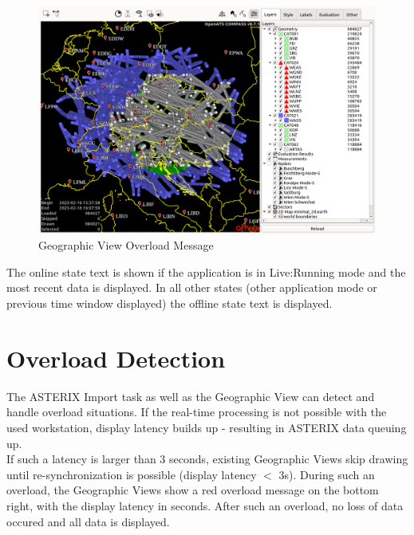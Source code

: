 \begin{figure}[H]
    \hspace*{-2.5cm}
    \includegraphics[width=19cm,frame]{figures/geoview_offline_status.png}
  \caption{Geographic View Overload Message}
\end{figure} 

The online state text is shown if the application is in Live:Running mode and the most recent data is displayed. In all other states (other application mode or previous time window displayed) the offline state text is displayed.


\section{Overload Detection}

The ASTERIX Import task as well as the Geographic View can detect and handle overload situations. If the real-time processing is not possible with the used workstation, display latency builds up - resulting in ASTERIX data queuing up. \\

If such a latency is larger than 3 seconds,  existing Geographic Views skip drawing until re-synchronization is possible (display latency $<$ 3s). During such an overload, the Geographic Views show a red overload message on the bottom right, with the display latency in seconds. After such an overload, no loss of data occured and all data is displayed. \\

